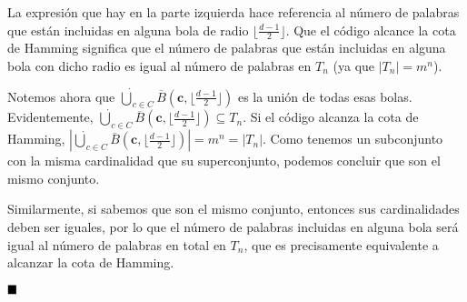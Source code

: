 La expresión que hay en la parte izquierda hace referencia al número de palabras que están incluidas en alguna bola de radio $\lfloor\frac{d-1}{2}\rfloor$. Que el código alcance la cota de Hamming significa que el número de palabras que están incluidas en alguna bola con dicho radio es igual al número de palabras en $T_n$ (ya que $|T_n| = m^n$).

Notemos ahora que $\dot{\bigcup}_{c\in C}\overline{B}(\textbf{c}, \lfloor\frac{d-1}{2}\rfloor)$ es la unión de todas esas bolas. Evidentemente, $\dot{\bigcup}_{c\in C}\overline{B}(\textbf{c}, \lfloor\frac{d-1}{2}\rfloor) \subseteq T_n$. Si el código alcanza la cota de Hamming, $|\dot{\bigcup}_{c\in C}\overline{B}(\textbf{c}, \lfloor\frac{d-1}{2}\rfloor)| = m^n = |T_n|$. Como tenemos un subconjunto con la misma cardinalidad que su superconjunto, podemos concluir que son el mismo conjunto.

Similarmente, si sabemos que son el mismo conjunto, entonces sus cardinalidades deben ser iguales, por lo que el número de palabras incluidas en alguna bola será igual al número de palabras en total en $T_n$, que es precisamente equivalente a alcanzar la cota de Hamming.

$\qed$
